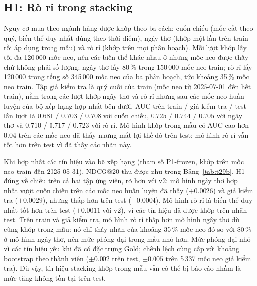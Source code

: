 \documentclass[jtehm]{ieeeaccess}
\begin{document}
\subsection{H1: Rò rỉ trong stacking}
\label{sec:h1}
Nguy cơ mua theo ngành hàng được khớp theo ba cách: cuốn chiếu (mốc cắt theo quý, biến thể duy nhất đúng theo thời điểm), ngây thơ (khớp một lần trên train rồi áp dụng trong mẫu) và rò rỉ (khớp trên mọi phân hoạch). Mỗi lượt khớp lấy tối đa 120\,000 mốc neo, nên các biến thể khác nhau ở những mốc neo được thấy chứ không phải số lượng: ngây thơ lấy 80\,\% trong 150\,000 mốc neo train; rò rỉ lấy 120\,000 trong tổng số 345\,000 mốc neo của ba phân hoạch, tức khoảng 35\,\% mốc neo train. Tập giả kiểm tra là quý cuối của train (mốc neo từ 2025-07-01 đến hết train), nằm trong các lượt khớp ngây thơ và rò rỉ nhưng sau các mốc neo huấn luyện của bộ xếp hạng hợp nhất bên dưới. AUC trên train / giả kiểm tra / test lần lượt là 0.681 / 0.703 / 0.708 với cuốn chiếu, 0.725 / 0.744 / 0.705 với ngây thơ và 0.710 / 0.717 / 0.723 với rò rỉ. Mô hình khớp trong mẫu có AUC cao hơn 0.04 trên các mốc neo đã thấy nhưng mất lợi thế đó trên test; mô hình rò rỉ vẫn tốt hơn trên test vì đã thấy các nhãn này.

Khi hợp nhất các tín hiệu vào bộ xếp hạng (tham số P1-frozen, khớp trên mốc neo train đến 2025-05-31), NDCG@20 thu được như trong Bảng~\ref{tab:t29b}. H1 đúng về chiều trên cả hai tập ứng viên, rõ hơn với v2: mô hình ngây thơ hợp nhất vượt cuốn chiếu trên các mốc neo huấn luyện đã thấy ($+0.0026$) và giả kiểm tra ($+0.0029$), nhưng thấp hơn trên test ($-0.0004$). Mô hình rò rỉ là biến thể duy nhất tốt hơn trên test ($+0.0011$ với v2), vì các tín hiệu đã được khớp trên nhãn test. Trên train và giả kiểm tra, mô hình rò rỉ thấp hơn mô hình ngây thơ dù cũng khớp trong mẫu: nó chỉ thấy nhãn của khoảng 35\,\% mốc neo đó so với 80\,\% ở mô hình ngây thơ, nên mức phóng đại trong mẫu nhỏ hơn. Mức phóng đại nhỏ vì các tín hiệu yếu khi đã có đặc trưng Gold; chênh lệch cùng cấp với khoảng bootstrap theo thành viên ($\pm 0.002$ trên test, $\pm 0.005$ trên 5\,337 mốc neo giả kiểm tra). Dù vậy, tín hiệu stacking khớp trong mẫu vẫn có thể bị báo cáo nhầm là mức tăng không tồn tại trên test.
\end{document}
